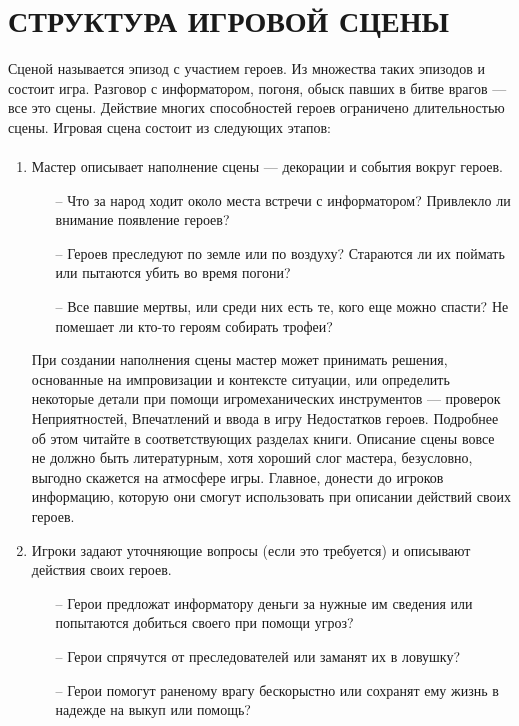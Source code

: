 \section{СТРУКТУРА ИГРОВОЙ СЦЕНЫ}
Сценой называется эпизод с участием героев. Из множества таких эпизодов и состоит игра. Разговор с информатором, погоня, обыск павших в битве врагов — все это сцены. Действие многих способностей героев ограничено длительностью сцены.
Игровая сцена состоит из следующих этапов:
\paragraph{}
\begin{enumerate}

 \item Мастер описывает наполнение сцены — декорации и события вокруг героев.
\begin{itemize}
\item[--] Что за народ ходит около места встречи с информатором? Привлекло ли внимание появление героев?
\item[--] Героев преследуют по земле или по воздуху? Стараются ли их поймать или пытаются убить во время погони?
\item[--] Все павшие мертвы, или среди них есть те, кого еще можно спасти? Не помешает ли кто-то героям собирать трофеи?
\end{itemize}
При создании наполнения сцены мастер может принимать решения, основанные на импровизации и контексте ситуации, или определить некоторые детали при помощи игромеханических инструментов — проверок Неприятностей, Впечатлений и ввода в игру Недостатков героев. Подробнее об этом читайте в соответствующих разделах книги.
\linebreak
Описание сцены вовсе не должно быть литературным, хотя хороший слог мастера, безусловно, выгодно скажется на атмосфере игры. Главное, донести до игроков информацию, которую они смогут использовать при описании действий своих героев.
 \item Игроки задают уточняющие вопросы (если это требуется) и описывают действия своих героев.
\begin{itemize}
\item[--] Герои предложат информатору деньги за нужные им сведения или попытаются добиться своего при помощи угроз?
\item[--] Герои спрячутся от преследователей или заманят их в ловушку?
\item[--] Герои помогут раненому врагу бескорыстно или сохранят ему жизнь в надежде на выкуп или помощь?

\end{itemize}
\end{enumerate}
